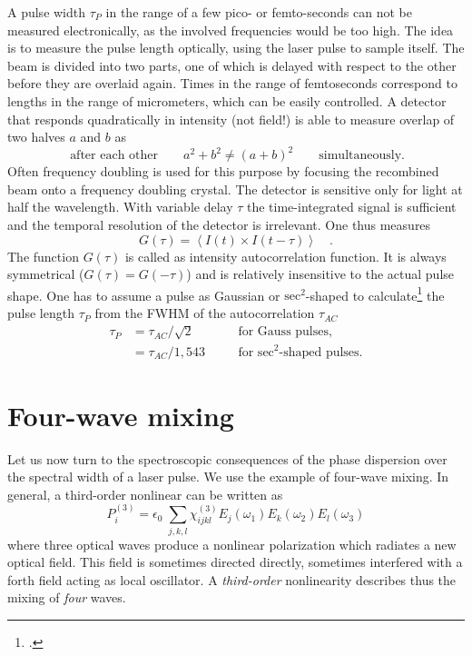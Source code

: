 A pulse width $\tau_P$ in the range of a few pico- or femto-seconds can not be measured electronically, as the involved frequencies  would be too high. The idea is to measure the pulse length optically, using the  laser pulse to sample itself. The beam is divided into two parts, one of which is delayed with respect to the other before they are overlaid again.
 Times in the 
range of femtoseconds correspond to lengths in the range of
micrometers, which can be easily controlled. A detector that responds quadratically in intensity (not field!) is able to measure  overlap of two halves $a$ and $b$ as
\begin{equation}
 \ \text{after each other} \qquad a^2 + b^2 \neq (a+b)^2 \qquad
 \text{simultaneously.}
\end{equation}
Often  frequency doubling is used for this purpose by focusing the
recombined beam onto a frequency doubling crystal.
The detector is sensitive only for light at half the wavelength. With variable delay $\tau$ the time-integrated signal is sufficient and  the temporal resolution
of the detector is  irrelevant. One thus measures
\begin{equation}
  G(\tau) = \left< I(t) \times I(t-\tau) \right> \quad.
\end{equation}
The function $G(\tau)$ is called as intensity autocorrelation function. It is always symmetrical ($G(\tau) = G(-\tau)$) and
is relatively insensitive to the actual pulse shape.  One has to assume a pulse as Gaussian
 or
$\text{sec}^2$-shaped to calculate\footcite{DielsRudolph1996} the pulse length $\tau_{P} $ from the 
FWHM of the autocorrelation
$\tau_{AC}$ 
\begin{align}
  \tau_{P} &= \tau_{AC} / \sqrt{2} &\quad& \text{for Gauss pulses,} \\
           &= \tau_{AC} / 1,543 && \text{for $\text{sec}^2$-shaped pulses.}
\end{align}

		
\section{Four-wave mixing}

Let us now turn to the spectroscopic consequences of the phase dispersion over the spectral width of a laser pulse. We use the example of four-wave mixing. In general, a third-order nonlinear can be written as
\begin{equation}
  P^{(3)}_i = \epsilon_0 \; 
    \sum_{j,k,l} \chi^{(3)}_{ijkl} E_j(\omega_1) E_k(\omega_2) E_l(\omega_3)  
\end{equation}		
where three optical waves produce a nonlinear polarization which radiates a new optical field. This field is sometimes directed directly, sometimes interfered with  a forth field acting as local oscillator. A \emph{third-order} nonlinearity describes thus the mixing of \emph{four} waves.
		
